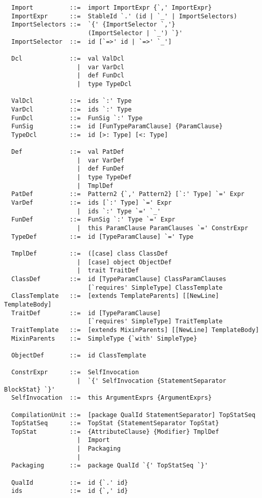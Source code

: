 \begin{lstlisting}
  Import          ::=  import ImportExpr {`,' ImportExpr}
  ImportExpr      ::=  StableId `.' (id | `_' | ImportSelectors)
  ImportSelectors ::=  `{' {ImportSelector `,'} 
                       (ImportSelector | `_') `}'
  ImportSelector  ::=  id [`=>' id | `=>' `_']

  Dcl             ::=  val ValDcl
                    |  var VarDcl
                    |  def FunDcl
                    |  type TypeDcl

  ValDcl          ::=  ids `:' Type
  VarDcl          ::=  ids `:' Type
  FunDcl          ::=  FunSig `:' Type
  FunSig          ::=  id [FunTypeParamClause] {ParamClause}
  TypeDcl         ::=  id [>: Type] [<: Type]

  Def             ::=  val PatDef
                    |  var VarDef
                    |  def FunDef
                    |  type TypeDef
                    |  TmplDef
  PatDef          ::=  Pattern2 {`,' Pattern2} [`:' Type] `=' Expr
  VarDef          ::=  ids [`:' Type] `=' Expr
                    |  ids `:' Type `=' `_'
  FunDef          ::=  FunSig `:' Type `=' Expr
                    |  this ParamClause ParamClauses `=' ConstrExpr
  TypeDef         ::=  id [TypeParamClause] `=' Type

  TmplDef         ::=  ([case] class ClassDef
                    |  [case] object ObjectDef
                    |  trait TraitDef
  ClassDef        ::=  id [TypeParamClause] ClassParamClauses 
                       [`requires' SimpleType] ClassTemplate 
  ClassTemplate   ::=  [extends TemplateParents] [[NewLine] TemplateBody]
  TraitDef        ::=  id [TypeParamClause]
                       [`requires' SimpleType] TraitTemplate
  TraitTemplate   ::=  [extends MixinParents] [[NewLine] TemplateBody]
  MixinParents    ::=  SimpleType {`with' SimpleType}
  
  ObjectDef       ::=  id ClassTemplate

  ConstrExpr      ::=  SelfInvocation
                    |  `{' SelfInvocation {StatementSeparator BlockStat} `}'
  SelfInvocation  ::=  this ArgumentExprs {ArgumentExprs}

  CompilationUnit ::=  [package QualId StatementSeparator] TopStatSeq
  TopStatSeq      ::=  TopStat {StatementSeparator TopStat}
  TopStat         ::=  {AttributeClause} {Modifier} TmplDef
                    |  Import
                    |  Packaging
                    |
  Packaging       ::=  package QualId `{' TopStatSeq `}'

  QualId          ::=  id {`.' id}
  ids             ::=  id {`,' id}
\end{lstlisting}

